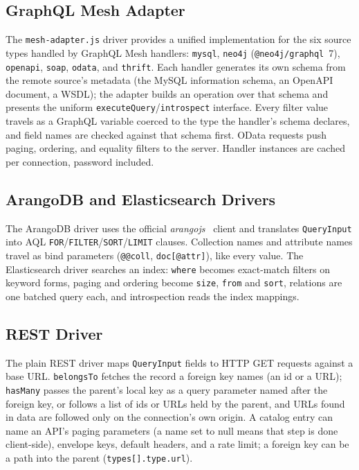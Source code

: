 \documentclass[sigconf,nonacm]{acmart}
\begin{document}
\subsection{GraphQL Mesh Adapter}

The \texttt{mesh-adapter.js} driver provides a unified implementation
for the six source types handled by GraphQL Mesh handlers:
\texttt{mysql}, \texttt{neo4j} (\texttt{@neo4j/graphql}~7),
\texttt{openapi}, \texttt{soap}, \texttt{odata}, and \texttt{thrift}.
Each handler generates its own schema from the remote source's metadata
(the MySQL information schema, an OpenAPI document, a WSDL); the
adapter builds an operation over that schema and presents the uniform
\texttt{executeQuery}/\texttt{introspect} interface.  Every
filter value travels as a GraphQL variable coerced to the type the
handler's schema declares, and field names are checked against that
schema first.  OData requests push paging, ordering, and equality
filters to the server.  Handler instances are cached per connection,
password included.

\subsection{ArangoDB and Elasticsearch Drivers}

The ArangoDB driver uses the official \emph{arangojs}~\cite{arangojs}
client and translates \texttt{QueryInput} into AQL
\texttt{FOR}/\texttt{FILTER}/\texttt{SORT}/\texttt{LIMIT} clauses.
Collection names and attribute names travel as bind parameters
(\texttt{@@coll}, \texttt{doc[@attr]}), like every value.  The
Elasticsearch driver searches an index: \texttt{where} becomes
exact-match filters on keyword forms, paging and ordering become
\texttt{size}, \texttt{from} and \texttt{sort}, relations are one
batched query each, and introspection reads the index mappings.

\subsection{REST Driver}

The plain REST driver maps \texttt{QueryInput} fields to HTTP GET
requests against a base URL.  \texttt{belongsTo} fetches the record a
foreign key names (an id or a URL); \texttt{hasMany} passes the parent's
local key as a query parameter named after the foreign key, or follows a
list of ids or URLs held by the parent, and URLs found in data are followed only on the
connection's own origin.  A catalog entry can name an API's paging
parameters (a name set to null means that step is done client-side),
envelope keys, default headers, and a rate limit; a foreign key can be a
path into the parent (\texttt{types[].type.url}).
\end{document}
